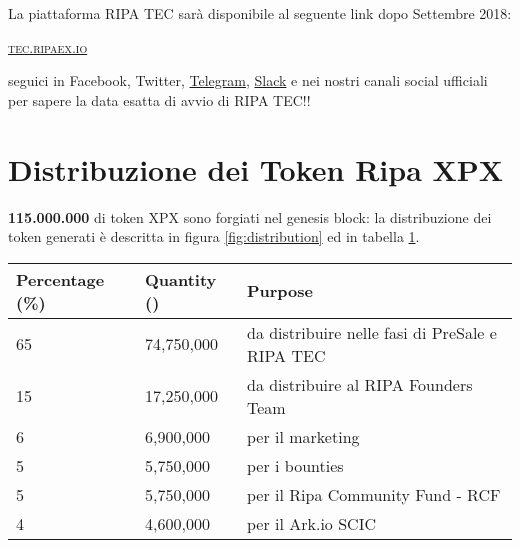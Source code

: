 \documentclass[11pt,fleqn]{book} %
\begin{document}
La piattaforma RIPA TEC sarà disponibile al seguente link dopo Settembre 2018:
\begin{center}
	\href{https://tex.ripaex.io}{\textsc{tec.ripaex.io}}
\end{center}
seguici in Facebook, Twitter, 
\href{https://t.me/ripaex}{Telegram}, 
\href{https://join.slack.com/t/ripaex/shared_invite/enQtMzM4NzUwNjU4OTQ0LTY3MDJmMTdhYTNlZjJlNGUxNzM1YjUwYjgyYjZlMDJmOTg3NTIzNThmNTYyMGQ3ODBkOTRmYzk3Y2Y4MzBkOTY}{Slack}
e nei nostri canali social ufficiali per sapere la data esatta di avvio di
RIPA TEC!!

\section{Distribuzione dei Token Ripa XPX}
\textbf{115.000.000} di token XPX sono forgiati nel genesis block: la distribuzione dei token generati è descritta
in figura \ref{fig:distribution} ed in tabella \ref{tab:distribution}.

\vspace{5mm}
	\label{fig:distribution}

\vspace{5mm}
\begin{table}[H]
	\centering
	\begin{tabular}{l l l}
		\toprule
		\textbf{Percentage (\%)} & \textbf{Quantity (\PHP)} & \textbf{Purpose} \\
		\midrule
		65		& 74,750,000	& da distribuire nelle fasi di PreSale e RIPA TEC	\\
		15      & 17,250,000	& da distribuire al RIPA Founders Team	\\
		6       & 6,900,000		& per il marketing	\\
		5       & 5,750,000 	& per i bounties	\\
		5       & 5,750,000		& per il Ripa Community Fund - RCF	\\
		4       & 4,600,000		& per il Ark.io SCIC \\
		\bottomrule
	\end{tabular}
	\label{tab:distribution}
\end{table}
\end{document}
